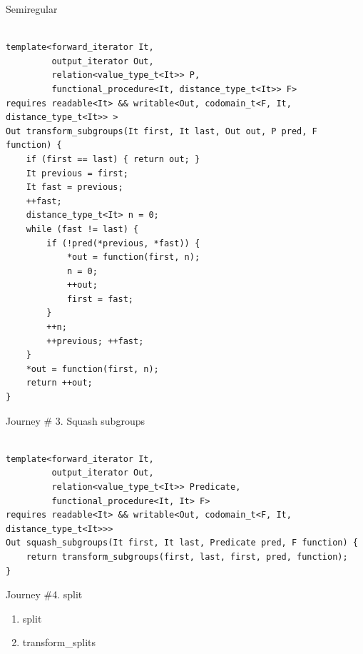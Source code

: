 \documentclass[10pt]{beamer}
\begin{document}
\begin{frame}[fragile]{Semiregular}
\begin{lstlisting}[style=cpp]

template<forward_iterator It,
         output_iterator Out,
         relation<value_type_t<It>> P,
         functional_procedure<It, distance_type_t<It>> F>
requires readable<It> && writable<Out, codomain_t<F, It, distance_type_t<It>> >
Out transform_subgroups(It first, It last, Out out, P pred, F function) {
    if (first == last) { return out; }
    It previous = first;
    It fast = previous;
    ++fast;
    distance_type_t<It> n = 0;
    while (fast != last) {
        if (!pred(*previous, *fast)) {
            *out = function(first, n);
            n = 0;
            ++out;
            first = fast;
        }
        ++n;
        ++previous; ++fast;
    }
    *out = function(first, n);
    return ++out;
}

\end{lstlisting}
\end{frame}



\begin{frame}[fragile]{Journey \# 3. Squash subgroups}
\begin{lstlisting}[style=cpp]

template<forward_iterator It,
         output_iterator Out,
         relation<value_type_t<It>> Predicate,
         functional_procedure<It, It> F>
requires readable<It> && writable<Out, codomain_t<F, It, distance_type_t<It>>>
Out squash_subgroups(It first, It last, Predicate pred, F function) {
    return transform_subgroups(first, last, first, pred, function);
}

\end{lstlisting}
\end{frame}

\begin{frame}{Journey \#4. split}
    \begin{enumerate}
        \item split
        \item transform\_splits
    \end{enumerate}
\end{frame}
\end{document}
